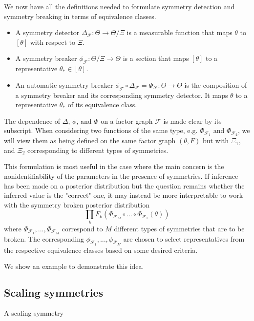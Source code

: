 We now have all the definitions needed to formulate symmetry detection and symmetry breaking in terms of equivalence classes.
\begin{itemize}

\item
A symmetry detector $\Delta_\mathcal{F}:\Theta\rightarrow\Theta/\Xi$ is a measurable function that maps $\theta$ to $[\theta]$ with respect to $\Xi$.

\item
A symmetry breaker $\phi_\mathcal{F}:\Theta/\Xi\rightarrow\Theta$ is a section that maps $[\theta]$ to a representative $\theta_*\in[\theta]$.

\item
An automatic symmetry breaker $\phi_\mathcal{F}\circ\Delta_\mathcal{F}=\Phi_\mathcal{F}:\Theta\rightarrow\Theta$ is the composition of a symmetry breaker and its corresponding symmetry detector. It maps $\theta$ to a representative $\theta_*$ of its equivalence class.

\end{itemize}

The dependence of $\Delta$, $\phi$, and $\Phi$ on a factor graph $\mathcal{F}$ is made clear by its subscript. When considering two functions of the same type, e.g. $\Phi_{\mathcal{F}_1}$ and $\Phi_{\mathcal{F}_2}$, we will view them as being defined on the same factor graph $(\theta,F)$ but with $\Xi_1,$ and $\Xi_2$ corresponding to different types of symmetries.

This formulation is most useful in the case where the main concern is the nonidentifiability of the parameters in the presence of symmetries. If inference has been made on a posterior distribution but the question remains whether the inferred value is the "correct" one, it may instead be more interpretable to work with the symmetry broken posterior distribution
\[
\prod_kF_k(\Phi_{\mathcal{F}_M}\circ ...\circ\Phi_{\mathcal{F}_1}(\theta))
\]
where $\Phi_{\mathcal{F}_1},...,\Phi_{\mathcal{F}_M}$ correspond to $M$ different types of symmetries that are to be broken. The corresponding $\phi_{\mathcal{F}_1},...,\phi_{\mathcal{F}_M}$ are chosen to select representatives from the respective equivalence classes based on some desired criteria.

We show an example to demonstrate this idea.


\subsection{Scaling symmetries}

A scaling symmetry \cite{Nishihara:2013}


